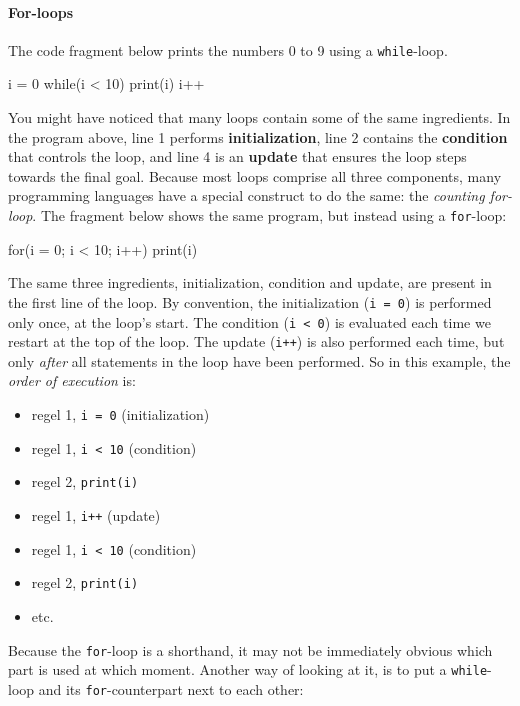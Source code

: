 \paragraph{For-loops}
The code fragment below prints the numbers 0 to 9 using a \texttt{while}-loop.

\begin{nnflisting}
i = 0
while(i < 10)
    print(i)
    i++
\end{nnflisting}

You might have noticed that many loops contain some of the same ingredients. In the program above, line 1 performs \textbf{initialization}, line 2 contains the \textbf{condition} that controls the loop, and line 4 is an \textbf{update} that ensures the loop steps towards the final goal. Because most loops comprise all three components, many programming languages have a special construct to do the same: the \emph{counting for-loop}. The fragment below shows the same program, but instead using a \texttt{for}-loop:

\begin{nnflisting}
for(i = 0; i < 10; i++)
    print(i)
\end{nnflisting}

The same three ingredients, initialization, condition and update, are present in the first line of the loop. By convention, the initialization (\texttt{i = 0}) is performed only once, at the loop's start. The condition (\texttt{i < 0}) is evaluated each time we restart at the top of the loop. The update (\texttt{i++}) is also performed each time, but only \emph{after} all statements in the loop have been performed. So in this example, the \emph{order of execution} is:

\begin{itemize}
\item regel 1, \texttt{i = 0} (initialization)
\item regel 1, \texttt{i < 10} (condition)
\item regel 2, \texttt{print(i)}
\item regel 1, \texttt{i++} (update)
\item regel 1, \texttt{i < 10} (condition)
\item regel 2, \texttt{print(i)}
\item etc.
\end{itemize}

Because the \texttt{for}-loop is a shorthand, it may not be immediately obvious which part is used at which moment. Another way of looking at it, is to put a \texttt{while}-loop and its \texttt{for}-counterpart next to each other:

